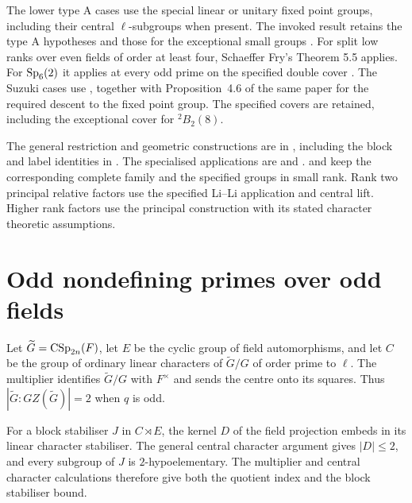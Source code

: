 The lower type A cases use the special linear or unitary fixed point
groups, including their central $\ell$-subgroups when present. The invoked
result retains the type A hypotheses
\cite{FengLiZhang2023Morita} and those for the exceptional small
groups \cite{FengLiZhang2023LowRankA}. For split low ranks
over even fields of order at least four, Schaeffer Fry's Theorem 5.5
applies. For $\operatorname{Sp}_6(2)$ it applies at every odd prime on the specified
double cover \cite{SchaefferFry2014}. The Suzuki cases use
\cite[Corollary~6.3]{Spath2013}, together with Proposition~4.6 of the same
paper for the required descent to the fixed point group. The specified
covers are retained, including the exceptional cover for ${}^2B_2(8)$.

\begin{implementation}
The general restriction and geometric constructions are in
, including the block and label
identities in .
The specialised applications are
 and
.
 and
 keep the corresponding
complete family and the specified groups in small rank.
Rank two principal relative factors use the specified Li--Li application
and central lift. Higher rank factors use the principal construction
with its stated character theoretic assumptions.
\end{implementation}

\section{Odd nondefining primes over odd fields}

Let $\widetilde G=\operatorname{CSp}_{2n}(F)$, let $E$ be the cyclic group of field
automorphisms, and let $C$ be the group of ordinary linear characters of
$\widetilde G/G$ of order prime to $\ell$. The multiplier identifies
$\widetilde G/G$ with $F^\times$ and sends the centre onto its squares. Thus
$|\widetilde G:GZ(\widetilde G)|=2$ when $q$ is odd.

For a block stabiliser $J$ in $C\rtimes E$, the kernel $D$ of the field
projection embeds in its linear character stabiliser. The general central
character argument gives $|D|\leq2$, and every subgroup of $J$ is
$2$-hypoelementary. The multiplier and central character calculations
therefore give both the quotient index and the block stabiliser bound.

